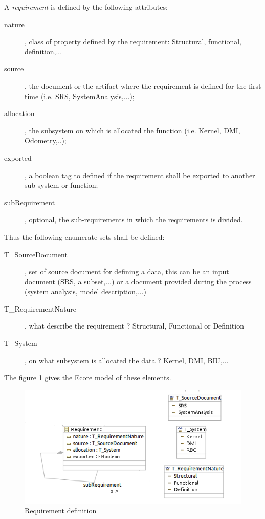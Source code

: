 A \textit{requirement} is defined by the following attributes:
\begin{description}
\item[nature], class of property defined by the requirement: Structural, functional, definition,...
\item[source], the document or the artifact where the requirement is defined for the first time (i.e. SRS, SystemAnalysis,...);
\item[allocation], the subsystem  on which is allocated the function (i.e. Kernel, DMI, Odometry,..);
\item[exported], a boolean tag to defined if the requirement shall be exported to another sub-system or function;
\item[subRequirement], optional, the sub-requirements in which the requirements is divided.
\end{description}

Thus the following enumerate sets shall be defined:
\begin{description}

\item[T\_SourceDocument], set of source document for defining a data, this can be an input document (SRS, a subset,...) or a document provided during the process (system analysis, model description,...) 
\item[T\_RequirementNature], what describe the requirement ? Structural, Functional or Definition
\item[T\_System], on what subsystem is allocated the data ? Kernel, DMI, BIU,...
\end{description}

The figure \ref{fig:requirement} gives the Ecore model of these elements.

\begin{figure}[ht]
  \centering
  \includegraphics{DataModel/Requirement1.png}
  \caption{Requirement definition}
  \label{fig:requirement}
\end{figure}


